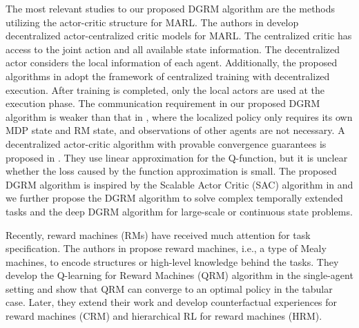 \documentclass[conf]{new-aiaa}
\def\foo ABC{DGRM}
\begin{document}
The most relevant studies to our proposed \foo ABC algorithm are the methods utilizing the actor-critic structure for MARL.
The authors in \cite{foerster2018counterfactual, lowe2017multi} develop decentralized actor-centralized critic models for MARL. The centralized critic has access to the joint action and all available state information. The decentralized actor considers the local information of each agent. Additionally, the proposed algorithms in \cite{foerster2018counterfactual, lowe2017multi} adopt the framework of centralized training with decentralized execution. After training is completed, only the local actors are used at the execution phase. The communication requirement in our proposed \foo ABC algorithm is weaker than that in \cite{foerster2018counterfactual, lowe2017multi}, where the localized policy only requires its own MDP state and RM state, and observations of other agents are not necessary. A decentralized actor-critic algorithm with provable convergence guarantees is proposed in \cite{zhang2018fully}. They use linear approximation for the Q-function, but it is unclear whether the loss caused by the function approximation is small. The proposed \foo ABC algorithm is inspired by the Scalable Actor Critic (SAC) algorithm in \cite{qu2020scalable} and we further propose the \foo ABC algorithm to solve complex temporally extended tasks and the deep \foo ABC algorithm for large-scale or continuous state problems.

Recently, reward machines (RMs) have received much attention for task specification. The authors in \cite{icarte2018using} propose reward machines, i.e., a type of Mealy machines, to encode structures or high-level knowledge behind the tasks. They develop the Q-learning for Reward Machines (QRM) algorithm in the single-agent setting and show that QRM can converge to an optimal policy in the tabular case. Later, they extend their work and develop counterfactual experiences for reward machines (CRM) and hierarchical RL for reward machines (HRM). 
\end{document}
